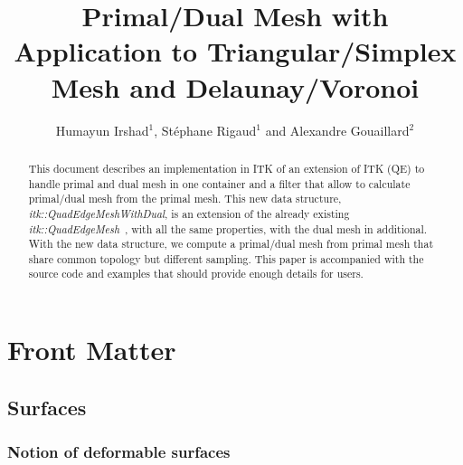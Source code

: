 \documentclass{InsightArticle}
\title{Primal/Dual Mesh with Application to Triangular/Simplex Mesh and Delaunay/Voronoi}
\author{Humayun Irshad$^{1}$, St\'{e}phane Rigaud$^{1}$ and Alexandre Gouaillard$^{2}$}
\newcommand{\IJhandlerIDnumber}{1338} %
\begin{document}
%
% 
\IJhandlefooter{\IJhandlerIDnumber}


\ifpdf
\else
\fi


\maketitle


\ifhtml
\chapter*{Front Matter\label{front}}
\fi


\begin{abstract}
\noindent
This document describes an implementation in ITK of an extension of ITK (QE) to handle primal and dual mesh in one container and a filter that allow to calculate primal/dual mesh from the primal mesh. This new data structure, \emph{itk::QuadEdgeMeshWithDual}, is an extension of the already existing \emph{itk::QuadEdgeMesh}~\cite{Gouaillard2006}, with all the same properties, with the dual mesh in additional. With the new data structure, we compute a primal/dual mesh from primal mesh that share common topology but different sampling. This paper is accompanied with the source code and examples that should provide enough details for users.
\end{abstract}
\IJhandlenote{\IJhandlerIDnumber}
\tableofcontents
\section{Surfaces}
\subsection{Notion of deformable surfaces}
\end{document}
